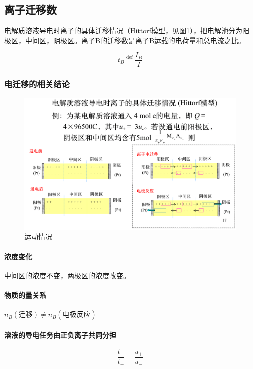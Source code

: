 \documentclass[a4paper]{ctexrep}
\begin{document}
        \subsection{离子迁移数}

        电解质溶液导电时离子的具体迁移情况（Hittorf模型，见图\ref{fig:u_B}），把电解池分为阳极区，中间区，阴极区。离子B的迁移数是离子B运载的电荷量和总电流之比。

        \[
            t_B \overset{\mathrm{def}}{=} \frac{I_B}{I}
        \]
        
        \subsubsection{电迁移的相关结论}

        \begin{figure}[h]
            \centering
            \includegraphics[width=1.0\textwidth]{u_B.png}
            \caption{运动情况}
            \label{fig:u_B}
        \end{figure}

        \paragraph{浓度变化} 中间区的浓度不变，两极区的浓度改变。
        \paragraph{物质的量关系} $n_B(\mbox{迁移}) \neq n_B(\mbox{电极反应})$
        \paragraph{溶液的导电任务由正负离子共同分担}
        \[
            \frac{t_{+}}{t_{-}} = \frac{u_{+}}{u_{-}}  
        \]
\end{document}
